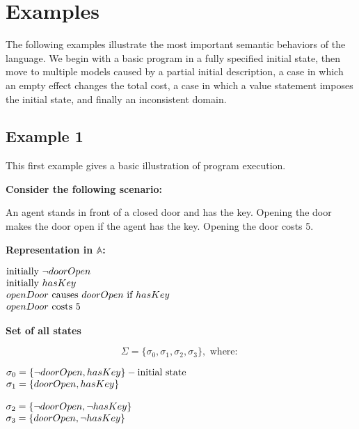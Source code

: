 \documentclass[11pt]{article}
\makeatletter
\newcommand{\states}{\Sigma}
\newcommand{\scenarioheader}{\par\noindent\textbf{Consider the following scenario:}\par}
\newcommand{\repheader}{\par\noindent\textbf{Representation in \(\mathbb{A}\):}\par}
\newcommand{\exampleblocktitle}[1]{\par\medskip\noindent\textbf{#1}\par\smallskip}
\newenvironment{centeredleftblock}[1][0.78\textwidth]
{\begin{center}\begin{minipage}{#1}\raggedright}
{\end{minipage}\end{center}}
\newenvironment{statementblock}
{\begin{flushleft}\renewcommand{\arraystretch}{1.1}\(\begin{array}{@{}l@{}}}
{\end{array}\)\end{flushleft}}
\makeatother
\begin{document}
\section{Examples}
The following examples illustrate the most important semantic behaviors of the
language. We begin with a basic program in a fully specified initial state,
then move to multiple models caused by a partial initial description, a case in
which an empty effect changes the total cost, a case in which a value
statement imposes the initial state, and finally an inconsistent domain.

\subsection*{Example 1}
This first example gives a basic illustration of program execution.

\scenarioheader
An agent stands in front of a closed door and has the key. Opening the door
makes the door open if the agent has the key. Opening the door costs 5.

\repheader
\begin{centeredleftblock}[0.62\textwidth]
\begin{statementblock}
\text{initially}~ \neg doorOpen \\
\text{initially}~ hasKey \\
openDoor ~\text{causes}~ doorOpen ~\text{if}~ hasKey \\
openDoor ~\text{costs}~ 5
\end{statementblock}
\end{centeredleftblock}


\exampleblocktitle{Set of all states}
\[
\states = \{\sigma_0, \sigma_1, \sigma_2, \sigma_3\},\text{ where: }
\]

\noindent
\begin{minipage}[t]{0.47\textwidth}
\begin{statementblock}
\sigma_0 = \{\neg doorOpen, hasKey\} - \text{initial state} \\
\sigma_1 = \{doorOpen, hasKey\}
\end{statementblock}
\end{minipage}
\hfill
\begin{minipage}[t]{0.47\textwidth}
\begin{statementblock}
\sigma_2 = \{\neg doorOpen, \neg hasKey\} \\
\sigma_3 = \{doorOpen, \neg hasKey\}
\end{statementblock}
\end{minipage}
\end{document}
